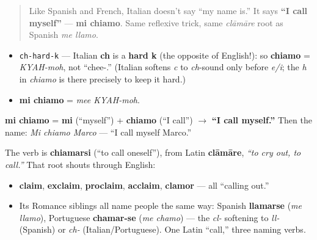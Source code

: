 \label{lesson:IT-C03-mi-chiamo}



\begin{quote}
Like Spanish and French, Italian doesn't say \textquotedblleft{}my name is.\textquotedblright{} It says \textbf{\textquotedblleft{}I call myself\textquotedblright{}} — \textbf{mi chiamo}. Same reflexive trick, same \emph{clāmāre} root as Spanish \emph{me llamo}.
\end{quote}

\begin{sounds}
\begin{itemize}
\raggedright
  \item \texttt{ch-hard-k} — Italian \textbf{ch} is a \textbf{hard k} (the opposite of English!): so \textbf{chiamo} = \emph{KYAH-moh}, not \textquotedblleft{}chee-.\textquotedblright{} (Italian softens \emph{c} to \emph{ch}-sound only before \emph{e/i}; the \emph{h} in \emph{chiamo} is there precisely to keep it hard.)
  \item \textbf{mi chiamo} = \emph{mee KYAH-moh}.
\end{itemize}
\end{sounds}

\begin{cousinweb}
\textbf{mi chiamo} = \textbf{mi} (\textquotedblleft{}myself\textquotedblright{}) + \textbf{chiamo} (\textquotedblleft{}I call\textquotedblright{}) $\to$ \textbf{\textquotedblleft{}I call myself.\textquotedblright{}} Then the name: \emph{Mi chiamo Marco} — \textquotedblleft{}I call myself Marco.\textquotedblright{}

The verb is \textbf{chiamarsi} (\textquotedblleft{}to call oneself\textquotedblright{}), from Latin \textbf{clāmāre}, \emph{\textquotedblleft{}to cry out, to call.\textquotedblright{}} That root shouts through English:

\begin{itemize}
\raggedright
  \item \textbf{claim}, \textbf{exclaim}, \textbf{proclaim}, \textbf{acclaim}, \textbf{clamor} — all \textquotedblleft{}calling out.\textquotedblright{}
  \item Its Romance siblings all name people the same way: Spanish \textbf{llamarse} (\emph{me llamo}), Portuguese \textbf{chamar-se} (\emph{me chamo}) — the \emph{cl-} softening to \emph{ll-} (Spanish) or \emph{ch-} (Italian/Portuguese). One Latin \textquotedblleft{}call,\textquotedblright{} three naming verbs.
\end{itemize}
\end{cousinweb}

